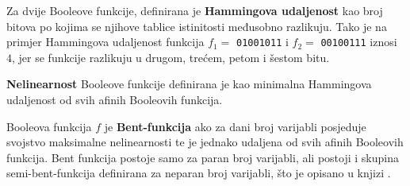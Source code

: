 Za dvije Booleove funkcije, definirana je \textbf{Hammingova udaljenost} kao broj bitova po kojima se njihove tablice istinitosti međusobno razlikuju.
Tako je na primjer Hammingova udaljenost funkcija $f_1 =$ \texttt{01001011} i $f_2 =$ \texttt{00100111} iznosi $4$, jer se funkcije razlikuju u drugom, trećem, petom i šestom bitu.

\textbf{Nelinearnost} Booleove funkcije definirana je kao minimalna Hammingova udaljenost od svih afinih Booleovih funkcija.

Booleova funkcija $f$ je \textbf{Bent-funkcija} ako za dani broj varijabli posjeduje svojstvo maksimalne nelinearnosti te je jednako udaljena od svih afinih Booleovih funkcija.
Bent funkcija postoje samo za paran broj varijabli, ali postoji i skupina semi-bent-funkcija definirana za neparan broj varijabli, što je opisano u knjizi \cite{CryptographicBooleanFunctions}.

